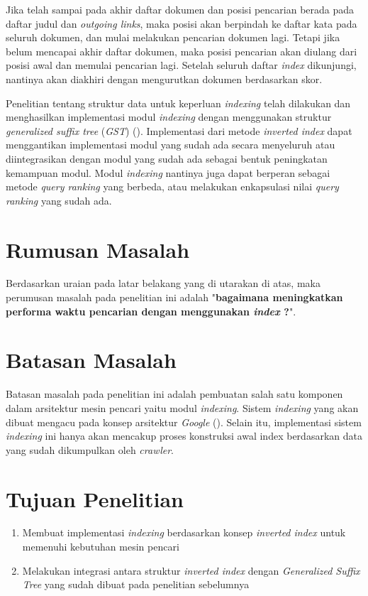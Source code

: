 Jika telah sampai pada akhir daftar dokumen dan posisi pencarian berada pada
daftar judul dan \emph{outgoing links}, maka posisi akan berpindah ke daftar
kata pada seluruh dokumen, dan mulai melakukan pencarian dokumen lagi. Tetapi
jika belum mencapai akhir daftar dokumen, maka posisi pencarian akan diulang
dari posisi awal dan memulai pencarian lagi. Setelah seluruh daftar
\emph{index} dikunjungi, nantinya akan diakhiri dengan mengurutkan dokumen
berdasarkan skor.

Penelitian tentang struktur data untuk keperluan \emph{indexing} telah dilakukan
dan menghasilkan implementasi modul \emph{indexing} dengan menggunakan struktur
\emph{generalized suffix tree} (\emph{GST}) (\cite{zaidan2023gst}). Implementasi
dari metode \emph{inverted index} dapat menggantikan implementasi modul yang 
sudah ada secara menyeluruh atau diintegrasikan dengan modul yang sudah ada 
sebagai bentuk peningkatan kemampuan modul. Modul \emph{indexing} nantinya juga
dapat berperan sebagai metode \emph{query ranking} yang berbeda, atau melakukan
enkapsulasi nilai \emph{query ranking} yang sudah ada.

\section{Rumusan Masalah}
Berdasarkan uraian pada latar belakang yang di utarakan di atas, maka perumusan
masalah pada penelitian ini adalah "\textbf{bagaimana meningkatkan performa 
waktu pencarian dengan menggunakan \textit{index} ?}".

\section{Batasan Masalah}

Batasan masalah pada penelitian ini adalah pembuatan salah satu komponen 
dalam arsitektur mesin pencari yaitu modul \emph{indexing}. Sistem
\emph{indexing} yang akan dibuat mengacu pada konsep arsitektur \emph{Google}
(\cite{brin1998google}). Selain itu, implementasi sistem \textit{indexing} ini
hanya akan mencakup proses konstruksi awal index berdasarkan data yang sudah
dikumpulkan oleh \textit{crawler}.

\section{Tujuan Penelitian}
\begin{enumerate}
	\item{Membuat implementasi \emph{indexing} berdasarkan konsep \textit{inverted
		index} untuk memenuhi kebutuhan mesin pencari}
	\item{Melakukan integrasi antara struktur \textit{inverted index} dengan
		\textit{Generalized Suffix Tree} yang sudah dibuat pada penelitian 
		sebelumnya}
\end{enumerate}


